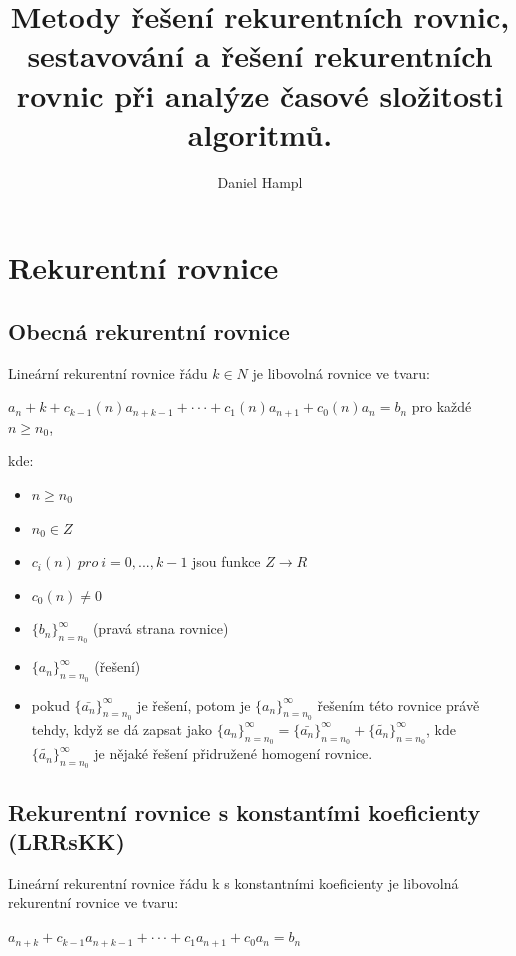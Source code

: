 \documentclass{szzclass}
\title{Metody řešení rekurentních rovnic, sestavování a   řešení rekurentních rovnic při analýze časové složitosti algoritmů.}
\author{Daniel Hampl}
\begin{document}
\maketitle

\tableofcontents
\newpage

\section{Rekurentní rovnice}

\subsection{Obecná rekurentní rovnice}

Lineární rekurentní rovnice řádu $k \in N$ je libovolná rovnice ve tvaru:

\begin{center}
$a_n+k + c_{k-1}(n) a_{n+k-1} + · · · + c_1(n) a_{n+1} + c_0(n) a_n = b_n$ pro každé $n \geq n_0$,
\end{center}


kde:
\begin{itemize}
    \item $n \geq n_0$
    \item $n_0 \in Z$
    \item $c_i(n)\ pro\ i = 0, . . . , k-1$ jsou funkce $Z \rightarrow R$
    \item $c_0(n) \neq 0$
    \item $\{b_n\}^\infty_{n = n_0}$ (pravá strana rovnice)
    \item $\{a_n\}^\infty_{n=n_0}$ (řešení)
    \item pokud $\{\bar{a_n}\}^\infty_{n=n_0}$ je řešení, potom je $\{a_n\}^\infty_{n=n_0}$
    řešením této rovnice právě tehdy, když se dá zapsat jako
    $\{a_n\}^\infty_{n=n_0} = \{\bar{a_n}\}^\infty_{n=n_0} + \{\tilde{a_n}\}^\infty_{n=n_0}$,
    kde $\{\tilde{a_n}\}^\infty_{n=n_0}$ je nějaké řešení přidružené homogení rovnice.
\end{itemize}

\subsection{Rekurentní rovnice s konstantími koeficienty (LRRsKK)}

Lineární rekurentní rovnice řádu k s konstantními koeficienty je
libovolná rekurentní rovnice ve tvaru:

\begin{center}
$a_{n+k} + c_{k−1}a_{n+k−1} + · · · + c_1a_{n+1} + c_0a_n = b_n$ 
\end{center}
\end{document}
